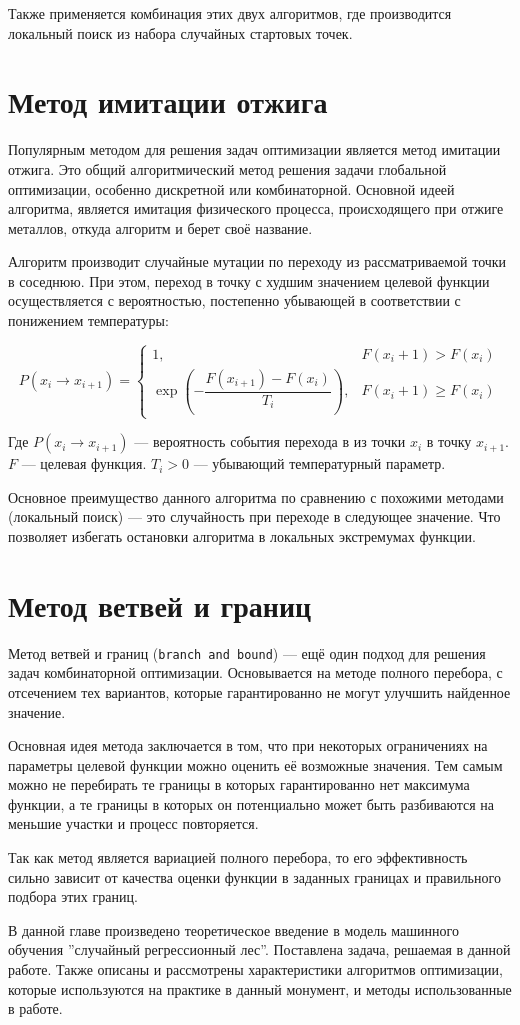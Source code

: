 Также применяется комбинация этих двух алгоритмов, где производится локальный
поиск из набора случайных стартовых точек.

\section{Метод имитации отжига}

Популярным методом для решения задач оптимизации является метод имитации отжига.
Это общий алгоритмический метод решения задачи глобальной оптимизации, особенно
дискретной или комбинаторной. Основной идеей алгоритма, является имитация
физического процесса, происходящего при отжиге металлов, откуда алгоритм и берет
своё название.

Алгоритм производит случайные мутации по переходу из рассматриваемой точки
в соседнюю. При этом, переход в точку с худшим значением целевой функции
осуществляется с вероятностью, постепенно убывающей в соответствии с понижением
температуры:

\[
P(x_i \to x_{i+1}) =
\begin{cases}
    1,                                                  & F(x_i+1) > F(x_i) \\
    \exp \left(-\dfrac{F(x_{i+1})-F(x_i)}{T_i}\right),  & F(x_i+1) \geqslant F(x_i)
\end{cases}
\]

Где $P(x_i \to x_{i+1})$ --- вероятность события перехода в из точки $x_i$
в точку $x_{i+1}$. $F$ --- целевая функция. $T_i > 0$ --- убывающий
температурный параметр.

Основное преимущество данного алгоритма по сравнению с похожими методами
(локальный поиск) --- это случайность при переходе в следующее значение. Что
позволяет избегать остановки алгоритма в локальных экстремумах функции.

\section{Метод ветвей и границ}

Метод ветвей и границ (\texttt{branch and bound}) --- ещё один подход для
решения задач комбинаторной оптимизации. Основывается на методе полного
перебора, с отсечением тех вариантов, которые гарантированно не могут улучшить
найденное значение.

Основная идея метода заключается в том, что при некоторых ограничениях на
параметры целевой функции можно оценить её возможные значения. Тем самым можно
не перебирать те границы в которых гарантированно нет максимума функции, а те
границы в которых он потенциально может быть разбиваются на меньшие участки
и процесс повторяется.

Так как метод является вариацией полного перебора, то его эффективность сильно
зависит от качества оценки функции в заданных границах и правильного подбора
этих границ.

\chapterconclusion

В данной главе произведено теоретическое введение в модель машинного обучения
''случайный регрессионный лес''. Поставлена задача, решаемая в данной работе.
Также описаны и рассмотрены характеристики алгоритмов оптимизации, которые
используются на практике в данный монумент, и методы использованные в работе.
